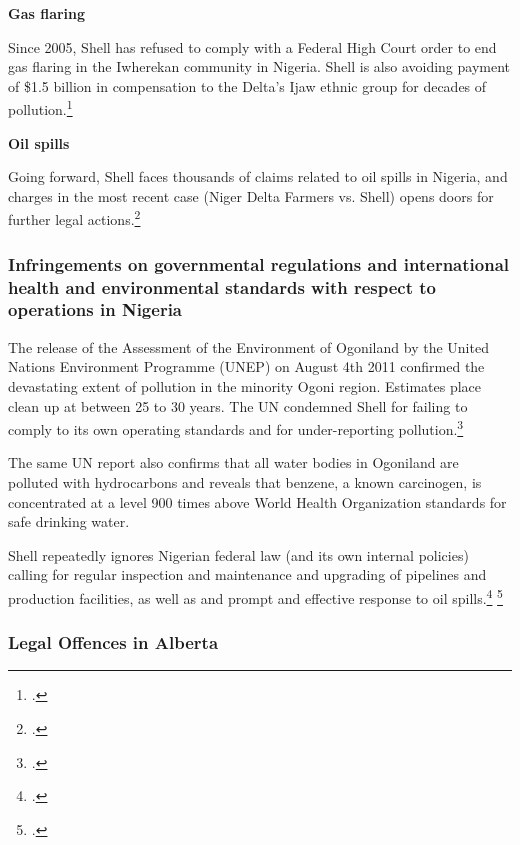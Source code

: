 \textbf{Gas flaring}



Since 2005, Shell has refused to comply with a Federal High Court order to end gas flaring in the Iwherekan community in Nigeria. 
Shell is also avoiding payment of \$1.5 billion in compensation to the Delta’s Ijaw ethnic group for decades of pollution.\footcite[][]{Ukala_2011}



\textbf{Oil spills}



Going forward, Shell faces thousands of claims related to oil spills in Nigeria, and charges in the most recent case (Niger Delta Farmers vs. Shell) opens doors for further legal actions.\footcite[][]{MixedVerdict_2012}



	\subsubsection{Infringements on governmental regulations and international health and environmental standards with respect to operations in Nigeria}
	
	
	
The release of the Assessment of the Environment of Ogoniland by the United Nations Environment Programme (UNEP) on August 4th 2011 confirmed the devastating extent of pollution in the minority Ogoni region. 
Estimates place clean up at between 25 to 30 years. 
The UN condemned Shell for failing to comply to its own operating standards and for under-reporting pollution.\footcite[][]{UNEP_2011}



The same UN report also confirms that all water bodies in Ogoniland are polluted with hydrocarbons and reveals that benzene, a known carcinogen, is concentrated at a level 900 times above World Health Organization standards for safe drinking water.



Shell repeatedly ignores Nigerian federal law (and its own internal policies) calling for regular inspection and maintenance and upgrading of pipelines and production facilities, as well as and prompt and effective response to oil spills.\footcite[][]{Steiner_2008}  \footcite[][]{Steiner_2010}



	\subsubsection{Legal Offences in Alberta}
	

